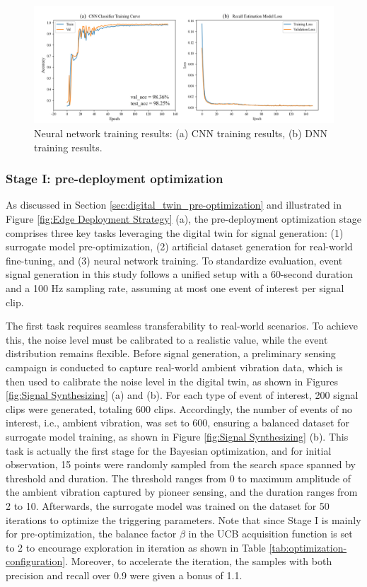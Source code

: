 \documentclass[a4paper,fleqn,numbers,sort&compress]{cas-sc}
\begin{document}
\begin{figure}[htbp]
    \centering
    \includegraphics[width=\linewidth]{Fig14.jpg}
    \caption{Neural network training results: (a) CNN training results, (b) DNN training results.}
    \label{fig: NN Training Results}
\end{figure}

\subsubsection{Stage I: pre-deployment optimization}

As discussed in Section \ref{sec:digital_twin_pre-optimization} and illustrated in Figure \ref{fig:Edge Deployment Strategy} (a), the pre-deployment optimization stage comprises three key tasks leveraging the digital twin for signal generation:
(1) surrogate model pre-optimization,
(2) artificial dataset generation for real-world fine-tuning, and
(3) neural network training. To standardize evaluation, event signal generation in this study follows a unified setup with a 60-second duration and a 100 Hz sampling rate, assuming at most one event of interest per signal clip.

The first task requires seamless transferability to real-world scenarios. To achieve this, the noise level must be calibrated to a realistic value, while the event distribution remains flexible. Before signal generation, a preliminary sensing campaign is conducted to capture real-world ambient vibration data, which is then used to calibrate the noise level in the digital twin, as shown in Figures \ref{fig:Signal Synthesizing} (a) and (b). For each type of event of interest, 200 signal clips were generated, totaling 600 clips. Accordingly, the number of events of no interest, i.e., ambient vibration, was set to 600, ensuring a balanced dataset for surrogate model training, as shown in Figure \ref{fig:Signal Synthesizing} (b). This task is actually the first stage for the Bayesian optimization, and for initial observation, 15 points were randomly sampled from the search space spanned by threshold and duration. The threshold ranges from 0 to maximum amplitude of the ambient vibration captured by pioneer sensing, and the duration ranges from 2 to 10. Afterwards, the surrogate model was trained on the dataset for 50 iterations to optimize the triggering parameters. Note that since Stage I is mainly for pre-optimization, the balance factor $\beta$ in the UCB acquisition function is set to 2 to encourage exploration in iteration as shown in Table \ref{tab:optimization-configuration}. Moreover, to accelerate the iteration, the samples with both precision and recall over 0.9 were given a bonus of 1.1. 
\end{document}
